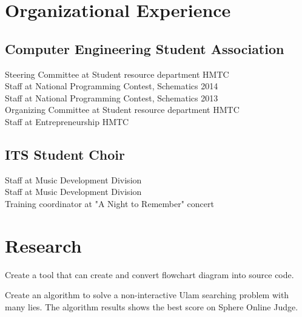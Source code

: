 \documentclass[letterpaper]{deedy-resume} %
\begin{document}
\hfill
\begin{minipage}[t]{0.59\textwidth} %


\section{Organizational Experience}

\subsection{Computer Engineering Student Association}
  Steering Committee at Student resource department HMTC \\
  Staff at National Programming Contest, Schematics 2014 \\
  Staff at National Programming Contest, Schematics 2013 \\
  Organizing Committee at Student resource department HMTC \\
  Staff at Entrepreneurship HMTC \\
\sectionspace

\subsection{ITS Student Choir}
  Staff at Music Development Division \\
  Staff at Music Development Division \\
  Training coordinator at "A Night to Remember" concert \\
\sectionspace


\section{Research}

Create a tool that can create and convert flowchart diagram into source code.
\sectionspace

Create an algorithm to solve a non-interactive Ulam searching problem with many lies. The algorithm results shows the best score on Sphere Online Judge.
\sectionspace

\end{minipage} %

\end{document}
